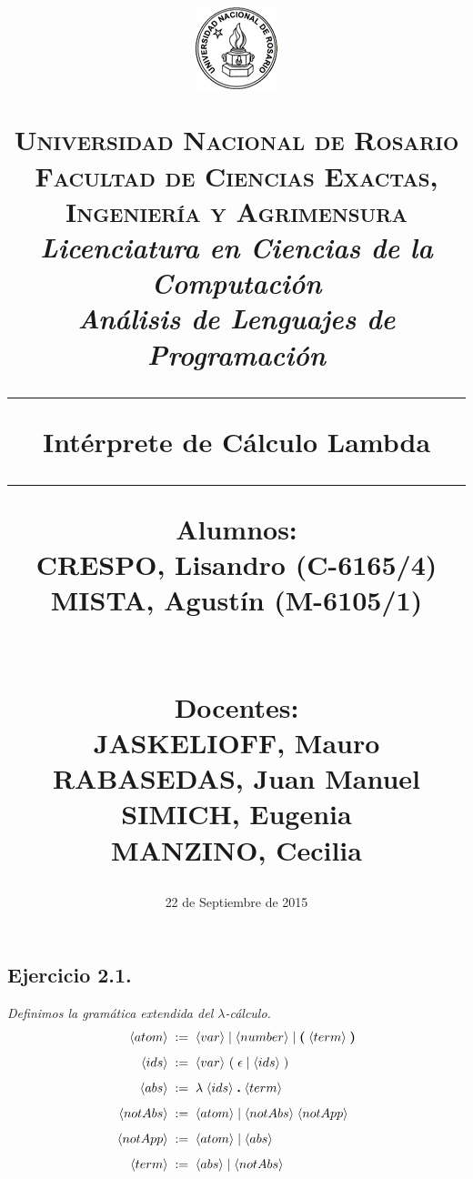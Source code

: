 \documentclass[a4paper,10pt]{article}
\title{
	\begin{figure}[!h]
		\centering
		\includegraphics[scale=1]{unr.png}
		\label{}
	\end{figure}
	\normalsize
		\textsc{Universidad Nacional de Rosario}\\	
		\textsc{Facultad de Ciencias Exactas, Ingeniería y Agrimensura}\\
		\textit{Licenciatura en Ciencias de la Computación}\\
		\textit{Análisis de Lenguajes de Programación}\\
	\vspace{30pt}
	\hrule{}
	\vspace{15pt}
	\huge
		\textbf{Intérprete de Cálculo Lambda}\\
	\vspace{15pt}
	\hrule{}
	\vspace{30pt}
	\begin{multicols}{2}
	\raggedright
		\large
			\textbf{Alumnos:}\\
		\normalsize
			CRESPO, Lisandro (C-6165/4) \\
			MISTA, Agustín (M-6105/1) \\
			$\;$ \\
			$\;$ \\
	\raggedleft
		\large
			\textbf{Docentes:}\\
		\normalsize
			JASKELIOFF, Mauro\\
			RABASEDAS, Juan Manuel\\
			SIMICH, Eugenia\\
			MANZINO, Cecilia\\
	\end{multicols}
}
\begin{document}
\date{22 de Septiembre de 2015}
\maketitle

\pagebreak
\subsection*{Ejercicio 2.1.} 
	\emph{Definimos la gramática extendida del $\lambda$-cálculo.}
	\\
	\begin{alignat*}{3}
		\langle atom \rangle \; &:= \; \langle var \rangle\; | \;\langle number \rangle\; | \;{\textbf (} \; \langle term \rangle \; {\textbf )}\\[0.5em]
		\langle ids \rangle \; &:= \; \langle var \rangle\ ( \; \epsilon\; | \; \langle ids \rangle\; )\\[0.5em]
		\langle abs \rangle \; &:= \; \lambda \;\langle ids \rangle\; {\textbf .}\; \langle term \rangle \\[0.5em]
		\langle notAbs \rangle \; &:= \; \langle atom \rangle\; | \;\langle notAbs \rangle \; \langle notApp \rangle \\[0.5em]
		\langle notApp \rangle \; &:= \; \langle atom \rangle\; | \;\langle abs \rangle \\[0.5em]
		\langle term \rangle \; &:= \; \langle abs \rangle\; | \;\langle notAbs \rangle \\[0.5em]
	\end{alignat*}
\end{document}
